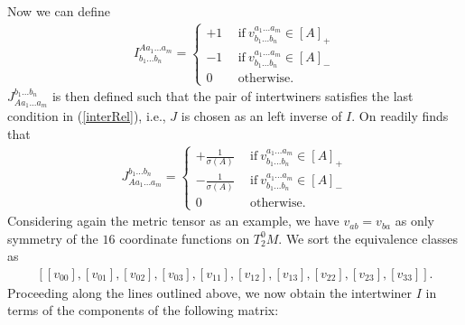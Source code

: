 \documentclass[a4paper,12pt, DIV=14, BCOR=5mm, twoside, headsepline, numbers=noenddot]{scrbook}
\begin{document}
Now we can define
\begin{align}\label{defI}
    I^{A a_1 ... a_m}_{b_1 ... b_n} = \begin{cases} 
        +1 \ \  &\text{if} \  v^{a_1 ... a_m}_{b_1 ... b_n} \in [A]_+ \\
        -1 \ \ &\text{if} \  v^{a_1 ... a_m}_{b_1 ... b_n} \in [A]_-  \\
        0 \ \   &\text{otherwise}. 
    \end{cases}
\end{align}
$J^{b_1 ... b_n}_{A a_1 ... a_m}$ is then defined such that the pair of intertwiners satisfies the last condition in (\ref{interRel}), i.e., $J$ is chosen as an left inverse of $I$. On readily finds that
\begin{align}\label{defJ}
    J^{b_1 ... b_n}_{A a_1 ... a_m} = \begin{cases}  +\frac{1}{\sigma(A)} \ \ &\text{if} \  v^{a_1 ... a_m}_{b_1 ... b_n} \in [A]_+\\
    -\frac{1}{\sigma(A)} \ \  &\text{if} \  v^{a_1 ... a_m}_{b_1 ... b_n} \in [A]_- \\ 
    0   \ \ &\text{otherwise}.
    \end{cases}
\end{align}
Considering again the metric tensor as an example, we have $v_{ab} = v_{ba}$ as only symmetry of the $16$ coordinate functions on $T^0_2M$. We sort the equivalence classes as 
\begin{align}
    \left[[v_{00}], [v_{01}], [v_{02}], [v_{03}], [v_{11}], [v_{12}], [v_{13}], [v_{22}], [v_{23}], [v_{33}]\right ].
\end{align}
Proceeding along the lines outlined above, we now obtain the intertwiner $I$ in terms of the components of the following matrix: 
\end{document}
